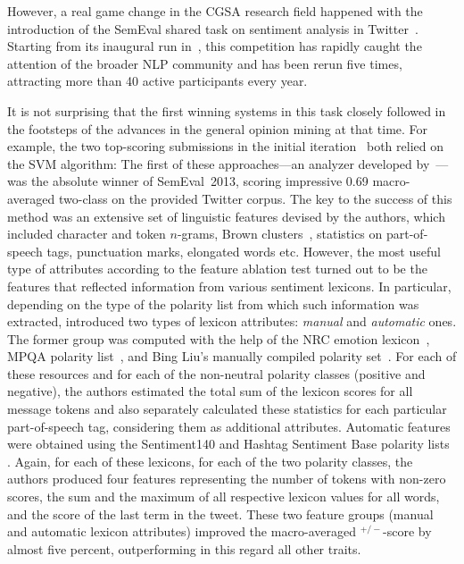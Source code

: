However, a real game change in the CGSA research field happened with
the introduction of the SemEval shared task on sentiment analysis in
Twitter~\cite{Nakov:13}.  Starting from its inaugural run
in~\citeyear{Nakov:13}, this competition has rapidly caught the
attention of the broader NLP community and has been rerun five times,
attracting more than 40 active participants every year.

It is not surprising that the first winning systems in this task
closely followed in the footsteps of the advances in the general
opinion mining at that time.  For example, the two top-scoring
submissions in the initial iteration~\cite{Mohammad:13,Guenther:13}
both relied on the SVM algorithm: The first of these approaches---an
analyzer developed by~\citet{Mohammad:13}---was the absolute winner of
SemEval~2013, scoring impressive 0.69 macro-averaged two-class \F{} on
the provided Twitter corpus.  The key to the success of this method
was an extensive set of linguistic features devised by the authors,
which included character and token $n$-grams, Brown
clusters~\cite{Brown:92}, statistics on part-of-speech tags,
punctuation marks, elongated words etc.  However, the most useful type
of attributes according to the feature ablation test turned out to be
the features that reflected information from various sentiment
lexicons.  In particular, depending on the type of the polarity list
from which such information was extracted, \citeauthor{Mohammad:13}
introduced two types of lexicon attributes: \emph{manual} and
\emph{automatic} ones.  The former group was computed with the help of
the NRC emotion lexicon~\cite{Mohammad:13a}, MPQA polarity
list~\cite{Wilson:05}, and Bing Liu's manually compiled polarity
set~\cite{Hu:04}.  For each of these resources and for each of the
non-neutral polarity classes (positive and negative), the authors
estimated the total sum of the lexicon scores for all message tokens
and also separately calculated these statistics for each particular
part-of-speech tag, considering them as additional attributes.
Automatic features were obtained using the Sentiment140 and Hashtag
Sentiment Base polarity lists \cite{Kiritchenko:14}.  Again, for each
of these lexicons, for each of the two polarity classes, the authors
produced four features representing the number of tokens with non-zero
scores, the sum and the maximum of all respective lexicon values for
all words, and the score of the last term in the tweet.  These two
feature groups (manual and automatic lexicon attributes) improved the
macro-averaged \F{}$^{+/-}$-score by almost five percent,
outperforming in this regard all other traits.

